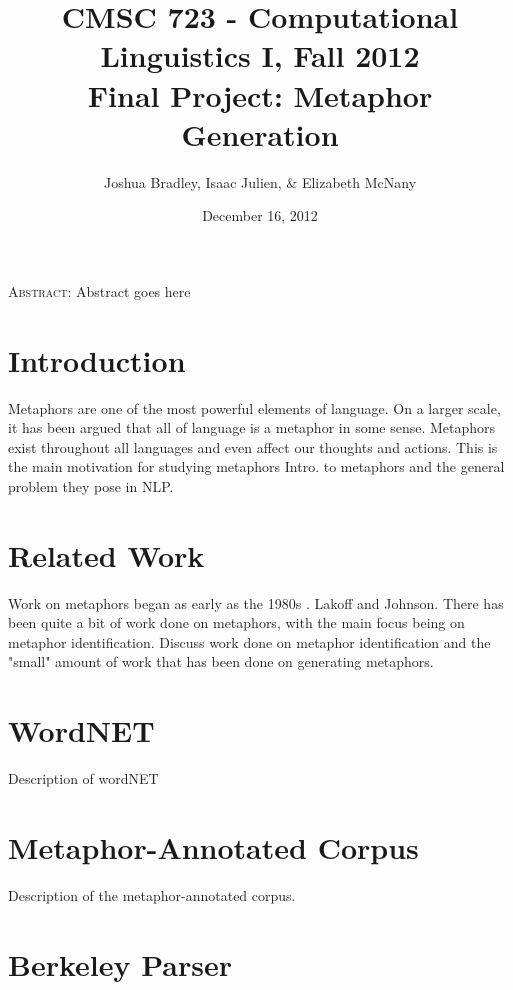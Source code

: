 \documentclass[12pt]{article}
\title{CMSC 723 - Computational Linguistics I, Fall 2012\\
Final Project: Metaphor Generation}
\author{Joshua Bradley, Isaac Julien, \& Elizabeth McNany}
\date{December 16, 2012}
\begin{document}
  \maketitle

\begin{comment}
\texttt{[image: BreakingRules.png]}
\end{comment}

\begin{center}
\small
\textsc{Abstract}: Abstract goes here
\end{center}

\section{Introduction}

Metaphors are one of the most powerful elements of language. On a larger scale, it has been argued that all of language is a metaphor in some sense. Metaphors exist throughout all languages and even affect our thoughts and actions. This is the main motivation for studying metaphors Intro. to metaphors and the general problem they pose in NLP.

\section{Related Work}

Work on metaphors began as early as the 1980s \cite{lakoff80}. Lakoff and Johnson. There has been quite a bit of work done on metaphors, with the main focus being on metaphor identification. Discuss work done on metaphor identification and the "small" amount of work that has been done on generating metaphors.

\section{WordNET}

Description of wordNET

\section{Metaphor-Annotated Corpus}

Description of the metaphor-annotated corpus.

\section{Berkeley Parser}
\end{document}
